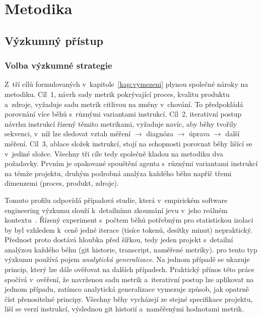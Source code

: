\chapter{Metodika}
\label{kap:metodika}


\section{Výzkumný přístup}
\label{sec:vyzkumny-pristup}

\subsection{Volba výzkumné strategie}
\label{sec:volba-strategie}

Z~tří cílů formulovaných v~kapitole~\ref{kap:vymezeni} plynou
společné nároky na metodiku. Cíl~1, návrh sady metrik pokrývající
proces, kvalitu produktu a~zdroje, vyžaduje sadu metrik citlivou na
změny v~chování. To předpokládá porovnání více běhů s~různými
variantami instrukcí. Cíl~2, iterativní postup návrhu
instrukcí řízený těmito metrikami, vyžaduje navíc, aby běhy tvořily
sekvenci, v~níž lze sledovat vztah měření $\to$ diagnóza $\to$
úprava $\to$ další měření. Cíl~3, ablace složek instrukcí, stojí na
schopnosti porovnat běhy lišící se v~jediné složce. Všechny tři cíle
tedy společně kladou na metodiku dva požadavky. Prvním je opakované spouštění
agenta s~různými variantami instrukcí na témže projektu, druhým podrobná
analýza každého běhu napříč třemi dimenzemi (proces, produkt,
zdroje).

Tomuto profilu odpovídá případová studie, která v~empirickém
software engineering výzkumu slouží k~detailnímu zkoumání jevu
v~jeho reálném kontextu~\cite{runeson2009}. Řízený
experiment s~počtem běhů potřebným pro statistickou izolaci by byl
vzhledem k~ceně jedné iterace (tisíce tokenů, desítky minut)
nepraktický. Přednost proto dostává hloubka před šířkou, tedy jeden
projekt s~detailní analýzou každého běhu (git historie, transcript,
naměřené metriky).
\textcite{yin2018} pro tento typ výzkumu používá pojem
\textit{analytická generalizace}. Na jednom případě se ukazuje
princip, který lze dále ověřovat na dalších případech.
Praktický přínos této práce spočívá v~ověření, že navrženou sadu
metrik a~iterativní postup lze aplikovat na jednom případu, zatímco
analytická generalizace vymezuje způsob, jak opatrně číst
přenositelné principy.
Všechny běhy vycházejí ze stejné specifikace projektu, liší se
verzí instrukcí, výslednou git historií a~naměřenými hodnotami
metrik.

